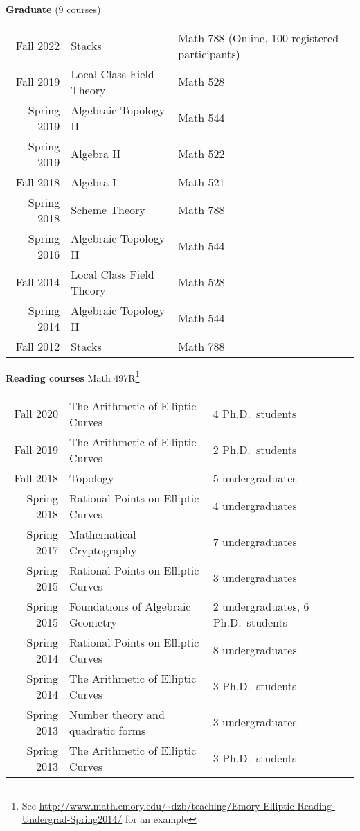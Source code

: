 \documentclass[margin,line]{res}
\newcommand{\defi}[1]{\textsf{#1}} 				%
\begin{document}
\begin{resume}
{\bf Graduate} (9 courses)
  \vspace*{-.1in}

\begin{tabular}{rll}  
  Fall 2022 & \defi{Stacks} & Math 788 (Online, 100 registered participants)\\
  Fall 2019 & \defi{Local Class Field Theory}  & Math 528\\
Spring 2019&  \defi{Algebraic Topology II}  & Math 544\\
Spring 2019&  \defi{Algebra  II}  & Math 522\\
Fall 2018&  \defi{Algebra  I}  & Math 521\\
Spring 2018&  \defi{Scheme Theory}  & Math 788\\
Spring 2016&  \defi{Algebraic Topology II}  & Math 544\\
Fall 2014&  \defi{Local Class Field Theory}  & Math 528\\
Spring 2014&  \defi{Algebraic Topology II}  & Math 544\\
Fall 2012&  \defi{Stacks}  & Math 788\\
\end{tabular}

{\bf Reading courses} Math 497R\footnote{See \url{http://www.math.emory.edu/~dzb/teaching/Emory-Elliptic-Reading-Undergrad-Spring2014/} for an example}
\vspace*{-.1in}

\begin{tabular}{rll}  
Fall 2020 &\defi{The Arithmetic of Elliptic Curves}  & 4 Ph.D.~students            \\
Fall 2019 &\defi{The Arithmetic of Elliptic Curves}  & 2 Ph.D.~students            \\  
Fall 2018 &\defi{Topology}   & 5 undergraduates\\
Spring 2018 &\defi{Rational Points on Elliptic Curves}  & 4 undergraduates\\
Spring 2017 &\defi{Mathematical Cryptography}   & 7 undergraduates        \\
Spring 2015 &\defi{Rational Points on Elliptic Curves}  & 3 undergraduates\\
Spring 2015 &\defi{Foundations of Algebraic Geometry}  & 2 undergraduates, 6 Ph.D.~students    \\
Spring 2014 &\defi{Rational Points on Elliptic Curves}  & 8 undergraduates\\
Spring 2014 &\defi{The Arithmetic of Elliptic Curves}  & 3 Ph.D.~students                \\
Spring 2013 &\defi{Number theory and quadratic forms}  & 3 undergraduates\\
Spring 2013 &\defi{The Arithmetic of Elliptic Curves}  & 3 Ph.D.~students            \\
\end{tabular}


\end{resume}
\end{document}
